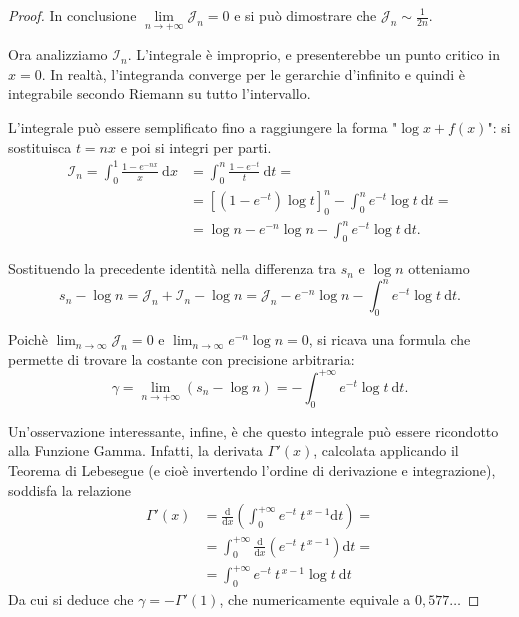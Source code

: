 \begin{proof}
	In conclusione $ \lim \limits_{n \to+ \infty} \mathcal{J}_n=0$ e si può dimostrare che $ \mathcal{J}_n \sim \frac{1}{2n}$.

	Ora analizziamo $ \mathcal{I}_n$. 
	L'integrale è improprio, e presenterebbe un punto critico in $x=0$. 
	In realtà, l'integranda converge per le gerarchie d'infinito e quindi è integrabile secondo Riemann su tutto l'intervallo.

	L'integrale può essere semplificato fino a raggiungere la forma "$ \log x +f(x)$": si sostituisca $t=nx$ e poi si integri per parti.
	\begin{align*}
			\mathcal{I}_n= 
			\int^1_0 \frac{1-e^{-nx}}{x} \: \mathrm{d}x
			&= 
			\int^n_0 \frac{1-e^{-t}}{t} \: \mathrm{d}t= 
			\\ &= 
			\left[ \left(1-e^{-t} \right) \log t \right]^n_0 - \int^n_0 e^{-t} \log t \: \mathrm{d}t=
			\\ &=
			\log n-e^{-n} \log n- \int^n_0e^{-t} \log t \: \mathrm{d}t.
	\end{align*}

	Sostituendo la precedente identità nella differenza tra $s_n$ e $ \log n$ otteniamo
	\begin{equation*}
		s_n- \log n= 
		\mathcal{J}_n+ \mathcal{I}_n- \log n= 
		\mathcal{J}_n-e^{-n} \log n- \int^n_0 e^{-t} \log t \: \mathrm{d}t.
	\end{equation*}

	Poichè $ \lim_{n \to \infty} \mathcal{J}_n=0$ e $ \lim_{n \to \infty} e^{-n} \log n=0$, si ricava una formula che permette di trovare la costante con precisione arbitraria:
	\begin{equation*}
		\gamma= 
		\lim \limits_{n \to+ \infty}(s_n- \log n)=
		- \int^{+ \infty}_0e^{-t} \log t \: \mathrm{d}t.
	\end{equation*}

	Un'osservazione interessante, infine, è che questo integrale può essere ricondotto alla Funzione Gamma.	
	Infatti, la derivata $ \Gamma'(x)$, calcolata applicando il Teorema di Lebesegue (e cioè invertendo l'ordine di derivazione e integrazione), soddisfa la relazione
	\begin{align*}
		\Gamma'(x)&= 
		\frac{ \mathrm{d}}{ \mathrm{d}x} \left( \int^{+ \infty}_0e^{-t} \: t^{ \,x-1} \mathrm{d}t \right) = 
		\\ &= 
		\int^{+ \infty}_0 \frac{ \mathrm{d}}{ \mathrm{d}x} \left( e^{-t} \: t^{ \,x-1} \right) \mathrm{d}t= 
		\\ &= 
		\int^{+ \infty}_0e^{-t} \: t^{ \,x-1} \log t \: \mathrm{d}t
	\end{align*}
	Da cui si deduce che $ \gamma=- \Gamma'(1)$, che numericamente equivale a $0,577 \dots$
\end{proof}
\pagebreak
